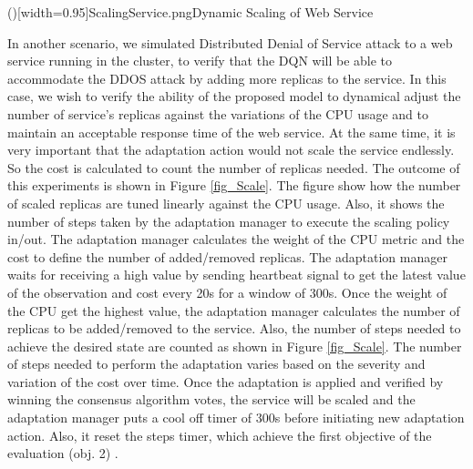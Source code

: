 \documentclass{ieeeaccess}
\begin{document}
\Figure[!t]()[width=0.95\textwidth]{ScalingService.png}{Dynamic Scaling of Web Service \label{fig_Scale}}
   
 

 

In another scenario, we simulated Distributed Denial of Service attack to a web service running in the cluster, to verify that the DQN will be able to accommodate the DDOS attack by adding more replicas to the service. In this case, we wish to verify the ability of the proposed model to dynamical adjust the number of service's replicas against the variations of the CPU usage and to maintain an acceptable response time of the web service. At the same time, it is very important that the adaptation action would not scale the service endlessly. So the cost is calculated to count the number of replicas needed. The outcome of this experiments is shown in Figure \ref{fig_Scale}. The figure show how the number of scaled replicas are tuned linearly against the CPU usage. Also, it shows the number of steps taken by the adaptation manager to execute the scaling policy in/out. The adaptation manager calculates the weight of the CPU metric and the cost to define the number of added/removed replicas. The adaptation manager waits for receiving a high value by sending heartbeat signal to get the latest value of the observation and cost every 20s for a window of 300s. Once the weight of the CPU get the highest value, the adaptation manager calculates the number of replicas to be added/removed to the service. Also, the number of steps needed to achieve the desired state are counted as shown in Figure \ref{fig_Scale}. The number of steps needed to perform the adaptation varies based on the severity and variation of the cost over time. Once the adaptation is applied and verified by winning the consensus algorithm votes, the service will be scaled and the adaptation manager puts a cool off timer of 300s before initiating new adaptation action. Also, it reset the steps timer, which achieve the first objective of the evaluation (obj. 2) . 
\end{document}
